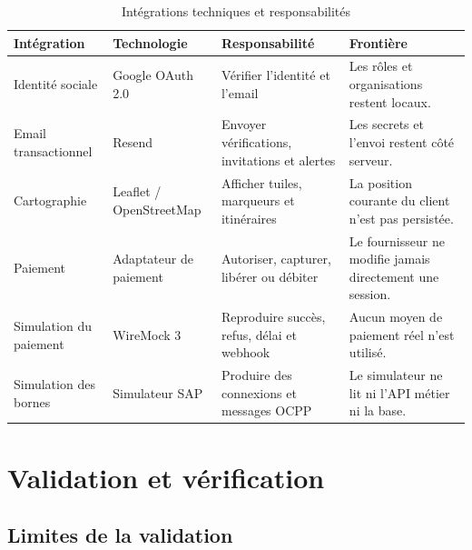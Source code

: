\begin{table}[H]
  \centering
  \caption{Intégrations techniques et responsabilités}
  \label{tab:external-integrations}
  \begin{tabularx}{\textwidth}{|p{3.0cm}|p{3.1cm}|Y|Y|}
    \hline
    \textbf{Intégration} & \textbf{Technologie} & \textbf{Responsabilité} &
    \textbf{Frontière}\\\hline
    Identité sociale & Google OAuth 2.0 & Vérifier l'identité et l'email &
    Les rôles et organisations restent locaux.\\\hline
    Email transactionnel & Resend & Envoyer vérifications, invitations et alertes &
    Les secrets et l'envoi restent côté serveur.\\\hline
    Cartographie & Leaflet / OpenStreetMap & Afficher tuiles, marqueurs et itinéraires &
    La position courante du client n'est pas persistée.\\\hline
    Paiement & Adaptateur de paiement & Autoriser, capturer, libérer ou débiter &
    Le fournisseur ne modifie jamais directement une session.\\\hline
    Simulation du paiement & WireMock 3 & Reproduire succès, refus, délai et webhook &
    Aucun moyen de paiement réel n'est utilisé.\\\hline
    Simulation des bornes & Simulateur SAP & Produire des connexions et messages OCPP &
    Le simulateur ne lit ni l'API métier ni la base.\\\hline
  \end{tabularx}
\end{table}

\section{Validation et vérification}

\subsection{Limites de la validation}

